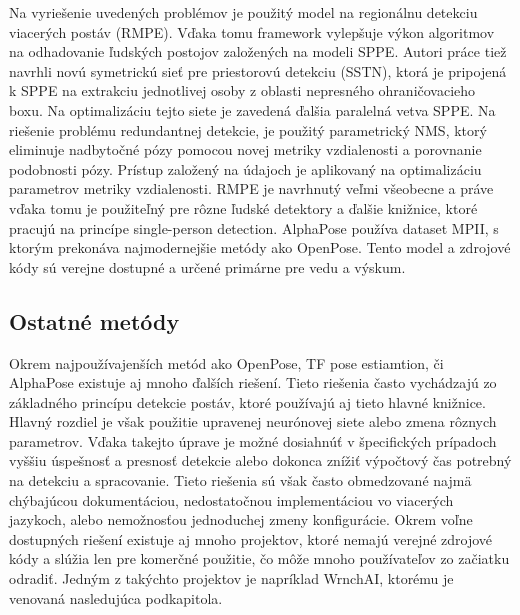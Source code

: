 \documentclass[slovak,master,dept460,male,cpp,cpdeclaration]{diploma}
\begin{document}
Na vyriešenie uvedených problémov je použitý model na regionálnu detekciu viacerých postáv (RMPE). Vďaka tomu
framework vylepšuje výkon algoritmov na odhadovanie ľudských postojov založených na modeli SPPE. Autori práce tiež navrhli novú symetrickú sieť pre priestorovú detekciu (SSTN), ktorá je pripojená k SPPE na extrakciu jednotlivej osoby z
oblasti nepresného ohraničovacieho boxu. Na optimalizáciu tejto siete je zavedená ďalšia paralelná vetva SPPE. Na riešenie problému redundantnej detekcie, je použitý parametrický NMS, ktorý eliminuje nadbytočné pózy pomocou novej metriky vzdialenosti a porovnanie podobnosti pózy. Prístup založený na údajoch je
aplikovaný na optimalizáciu parametrov metriky vzdialenosti. RMPE je navrhnutý veľmi všeobecne a práve vďaka tomu je použiteľný pre rôzne ľudské detektory a ďalšie knižnice, ktoré pracujú na princípe single-person detection. AlphaPose používa dataset MPII, s ktorým prekonáva najmodernejšie metódy ako OpenPose. Tento model a zdrojové kódy\cite{githubAlphaPose} sú verejne dostupné a určené primárne pre vedu a výskum.

\newpage
\subsection{Ostatné metódy}
Okrem  najpoužívajenších metód ako OpenPose, TF pose estiamtion, či AlphaPose existuje aj mnoho ďalších riešení. Tieto riešenia často vychádzajú zo základného princípu detekcie postáv, ktoré používajú aj tieto hlavné knižnice. Hlavný rozdiel je však použitie upravenej neurónovej siete alebo zmena rôznych parametrov. Vďaka takejto úprave je možné dosiahnúť v špecifických prípadoch vyššiu úspešnosť a presnosť detekcie alebo dokonca znížiť výpočtový čas potrebný na detekciu a spracovanie. Tieto riešenia sú však často obmedzované najmä chýbajúcou dokumentáciou, nedostatočnou implementáciou vo viacerých jazykoch, alebo nemožnosťou jednoduchej zmeny konfigurácie. Okrem voľne dostupných riešení existuje aj mnoho projektov, ktoré nemajú verejné zdrojové kódy a slúžia len pre komerčné použitie, čo môže mnoho používateľov zo začiatku odradiť. Jedným z takýchto projektov je napríklad WrnchAI, ktorému je venovaná nasledujúca podkapitola.
\end{document}
